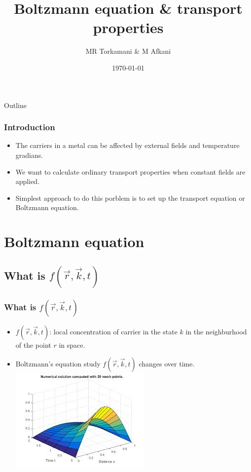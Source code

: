 \documentclass{beamer}
\title{Boltzmann equation \& transport properties}
\author{MR Torkamani \& M Afkani}
\institute{Kharazmi university}
\date{\monthyeardate\today}
\begin{document}
\begin{frame}
\titlepage
\end{frame}
\begin{frame}[allowframebreaks]{Outline}
  \tableofcontents[sections={1-2}]
    \framebreak
  \tableofcontents[sections={3-5}]
\end{frame}
\begin{frame}
\frametitle{Introduction}
\begin{itemize}
\item The carriers in a metal can be affected by external fields and temperature gradians.
\pause
\item We want to calculate ordinary transport properties when constant fields are applied.
\pause
\item Simplest approach to do this porblem is to set up the transport equation or Boltzmann equation.
\end{itemize}
\end{frame}
\section{Boltzmann equation}
\subsection{What is $f (\vec{r},\vec{k},t)$}
\begin{frame}
\frametitle{What is $f (\vec{r},\vec{k},t)$}
\begin{itemize}
\item $f (\vec{r},\vec{k},t)$: local concentration of carrier in the state $k$ in the neighburhood of the point $r$ in space.
\pause
\item Boltzmann's equation study $f (\vec{r},\vec{k},t)$ changes over time.
\pause
\includegraphics[scale=.7]{boltzmann}
\end{itemize}
\end{frame}
\end{document}
